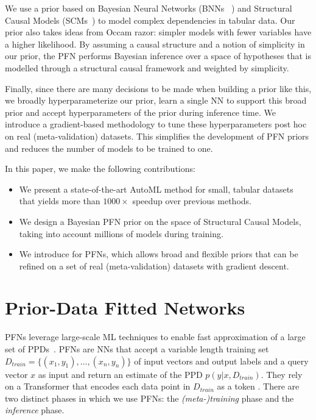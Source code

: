 \documentclass{article}
\begin{document}
We use a prior based on Bayesian Neural Networks (BNNs ~\citep{neal-bayes96a,gal-phdthesis16a}) and Structural Causal Models (SCMs~\citep{pearl_2009,causalinferencelearningbook}) to model complex dependencies in tabular data. 
Our prior also takes ideas from Occam razor: simpler models  with fewer variables have a higher likelihood.
By assuming a causal structure and a notion of simplicity in our prior, the PFN performs Bayesian inference over a space of hypotheses that is modelled through a structural causal framework and weighted by simplicity.

Finally, since there are many decisions to be made when building a prior like this, we broadly hyperparameterize our prior, learn a single NN to support this broad prior and accept hyperparameters of the prior during inference time. We introduce a gradient-based methodology to tune these hyperparameters post hoc on real (meta-validation) datasets. 
This simplifies the development of PFN priors and reduces the number of models to be trained to one.

In this paper, we make the following contributions:
\begin{itemize}
    \item We present a state-of-the-art AutoML method for small, tabular datasets that yields more than $1000\times$ speedup over previous methods.
    \item We design a Bayesian PFN prior on the space of Structural Causal Models, taking into account millions of models during training.
    \item We introduce \priortuning{} for PFNs, which allows broad and flexible priors that can be refined on a set of real (meta-validation)
    datasets with gradient descent.
\end{itemize}


\section{Prior-Data Fitted Networks}
PFNs leverage large-scale ML techniques to enable fast approximation of a large set of PPDs~\citep{muller-iclr2022}.
PFNs are NNs that accept a variable length training set $D_{train} = \{(x_1,y_1), \dots, (x_n,y_n)\}$ of input vectors and output labels and a query vector $x$ as input and return an estimate of the PPD $p(y|x,D_{train})$.
They rely on a Transformer that encodes each data point in $D_{train}$ as a token \citep{vaswani-neurips17}.
There are two distinct phases in which we use PFNs: the \textit{(meta-)training} phase and the \textit{inference} phase.
\end{document}

